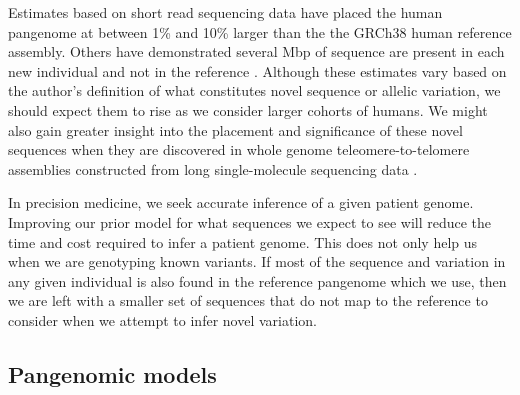 Estimates based on short read sequencing data have placed the human pangenome at between 1\% \cite{li2010building} and 10\% \cite{sherman2019assembly} larger than the the GRCh38 human reference assembly.
Others have demonstrated several Mbp of sequence are present in each new individual and not in the reference \cite{li2010building,Steinberg_2016,Audano_2019}.
Although these estimates vary based on the author's definition of what constitutes novel sequence or allelic variation, we should expect them to rise as we consider larger cohorts of humans.
We might also gain greater insight into the placement and significance of these novel sequences when they are discovered in whole genome teleomere-to-telomere assemblies constructed from long single-molecule sequencing data \cite{miga2019telomere,Langley_2019}.



In precision medicine, we seek accurate inference of a given patient genome.
Improving our prior model for what sequences we expect to see will reduce the time and cost required to infer a patient genome.
This does not only help us when we are genotyping known variants.
If most of the sequence and variation in any given individual is also found in the reference pangenome which we use, then we are left with a smaller set of sequences that do not map to the reference to consider when we attempt to infer novel variation.

\subsection{Pangenomic models}

